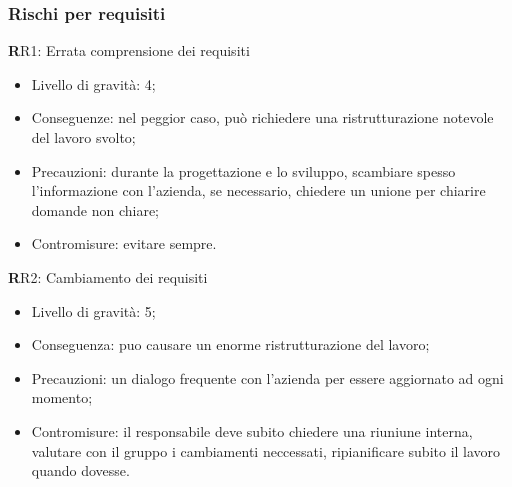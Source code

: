 \subsubsection{Rischi per requisiti}
\textbf RR1: 
Errata comprensione dei requisiti
\begin{itemize}
\item Livello di gravità: 4;
\item Conseguenze: nel peggior caso, può richiedere una ristrutturazione notevole del lavoro svolto;
\item Precauzioni: durante la progettazione e lo sviluppo, scambiare spesso l’informazione con l’azienda, se necessario, chiedere un unione per chiarire domande non chiare;
\item Contromisure: evitare sempre.
\end{itemize}
\textbf RR2:
Cambiamento dei requisiti
\begin{itemize}
\item Livello di gravità: 5;
\item Conseguenza: puo causare un enorme ristrutturazione del lavoro;
\item Precauzioni: un dialogo frequente con l'azienda per essere aggiornato ad ogni momento;
\item Contromisure: il responsabile deve subito chiedere una riuniune interna, valutare con il gruppo i cambiamenti neccessati, ripianificare subito il lavoro quando dovesse.
\end{itemize}



